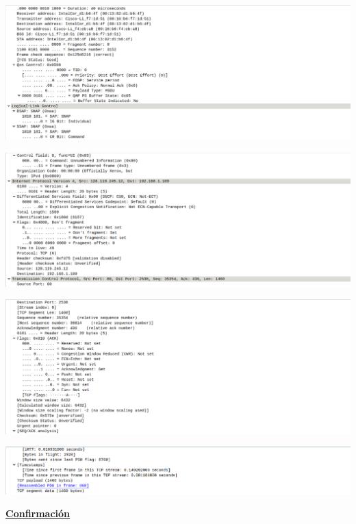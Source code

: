 \documentclass{article}
\begin{document}
\begin{center}
\includegraphics[scale=0.3]{WLAN/tcpres6.png}
\end{center}
\begin{center}
\includegraphics[scale=0.3]{WLAN/tcpres7.png}
\end{center}
\begin{center}
\includegraphics[scale=0.3]{WLAN/tcpres8.png}
\end{center}
\begin{center}
\includegraphics[scale=0.3]{WLAN/tcpres9.png}
\end{center}

\textbf{\underline{Confirmación}}
\end{document}
